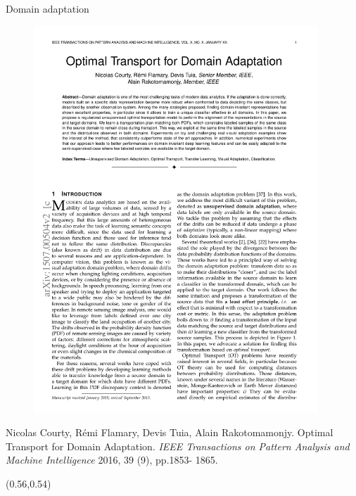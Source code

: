 \documentclass[pdf,aspectratio=169,10pt]{beamer}
\begin{document}
\begin{frame}{  Domain  adaptation}
\begin{minipage}{0.49\textwidth}
    \begin{figure}
        \includegraphics[trim={0cm 18.5cm 0cm 0cm},clip, page=1, width=0.95\textwidth]{../img/OT4DA}
    \end{figure}

{
\tiny
Nicolas Courty, Rémi Flamary, Devis Tuia, Alain Rakotomamonjy. Optimal Transport for Domain
Adaptation. \emph{IEEE Transactions on Pattern Analysis and Machine Intelligence} 2016, 39 (9), pp.1853-
1865.
}

\end{minipage}




\begin{textblock}{0.45}(0.56,0.54)
\small
{}
\end{textblock}
\end{frame}
\end{document}
